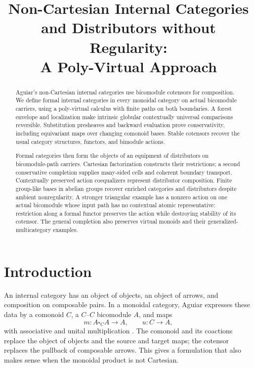 \documentclass[11pt,reqno]{amsart}
\title[Formal categories and distributors]{Non-Cartesian Internal Categories\\and Distributors without Regularity:\\A Poly-Virtual Approach}
\date{}
\theoremstyle{plain}
\theoremstyle{definition}
\theoremstyle{remark}
\numberwithin{equation}{section}
\begin{document}
\begin{abstract}
Aguiar's non-Cartesian internal categories use bicomodule cotensors for
composition. We define formal internal categories in every monoidal
category on actual bicomodule carriers, using a poly-virtual calculus
with finite paths on both boundaries. A forest envelope and localization
make intrinsic globular contextually universal comparisons reversible.
Substitution presheaves and backward evaluation prove conservativity,
including equivariant maps over changing comonoid bases. Stable cotensors
recover the usual category structures, functors, and bimodule actions.

Formal categories then form the objects of an equipment of distributors
on bicomodule-path carriers. Cartesian factorization constructs their
restrictions; a second conservative completion supplies many-sided cells
and coherent boundary transport. Contextually preserved action
coequalizers represent distributor composition. Finite group-like bases
in abelian groups recover enriched categories and distributors despite
ambient nonregularity. A stronger triangular example has a nonzero action
on one actual bicomodule whose input path has no contextual atomic
representative: restriction along a formal functor preserves the action
while destroying stability of its cotensor. The general completion also
preserves virtual monoids and their generalized-multicategory examples.
\end{abstract}
\maketitle
\tableofcontents

\section{Introduction}\label{sec:intro}

An internal category has an object of objects, an object of arrows, and
composition on composable pairs. In a monoidal category, Aguiar expresses
these data by a comonoid $C$, a $C$--$C$ bicomodule $A$, and maps
\[
 m:A\square_C A\longrightarrow A,\qquad u:C\longrightarrow A,
\]
with associative and unital multiplication
\cite[Definition 2.3.1]{Aguiar1997}. The comonoid and its coactions replace
the object of objects and the source and target maps; the cotensor replaces
the pullback of composable arrows. This gives a formulation that also
makes sense when the monoidal product is not Cartesian.
\end{document}
